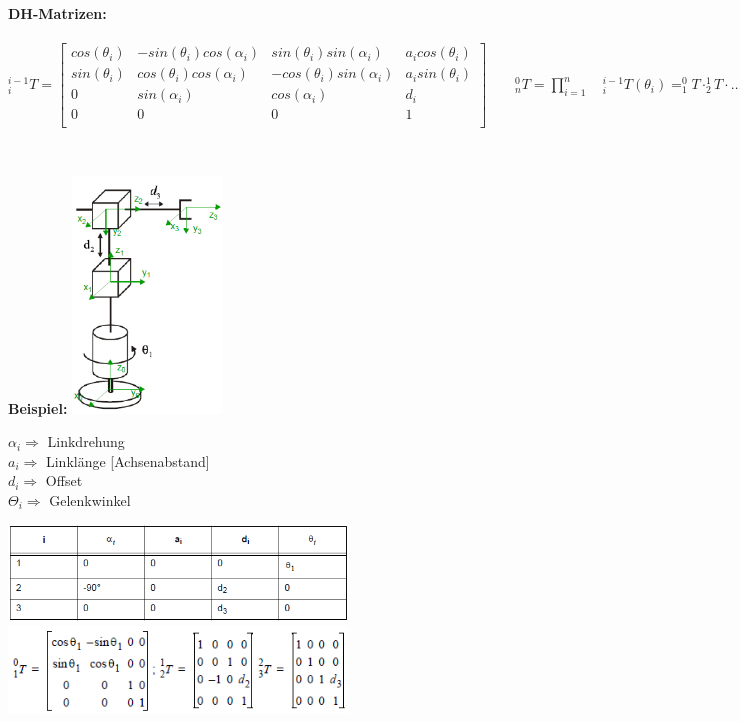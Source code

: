 \begin{minipage}{19cm}
    \textbf{DH-Matrizen: }\\ \\
    $ ^{i-1}_{i}T =
    \begin{bmatrix}
    cos(\theta_i) & -sin(\theta_i) cos(\alpha_i) &  sin(\theta_i) sin(\alpha_i) & a_i cos(\theta_i)\\
    sin(\theta_i) &  cos(\theta_i) cos(\alpha_i) & -cos(\theta_i) sin(\alpha_i) & a_i sin(\theta_i)\\
    0			  &  sin(\alpha_i)				 &  cos(\alpha_i)				& d_i\\
    0			  &  0							 &  0							& 1\\
    \end{bmatrix}
    \qquad
    ^{0}_{n}T = \prod\limits_{i=1}^{n} \quad ^{i-1}_{i}T(\theta_{i}) = ^{0}_{1}T \cdot ^{1}_{2}T \cdot \ldots \cdot ^{n-1}_{n}T $
\end{minipage}\\

\begin{minipage}{3cm}
    \textbf{Beispiel:}
    \includegraphics[width=4cm]{./bilder/denavitgrafik} \\
\end{minipage}
\begin{minipage}{6cm}
    $\alpha_{i} \Longrightarrow $ Linkdrehung  \\
    $ a_{i} \Longrightarrow $ Linklänge [Achsenabstand] \\
    $ d_{i} \Longrightarrow $ Offset \\
    $ \Theta_{i} \Longrightarrow $ Gelenkwinkel \\ 
\end{minipage}
\begin{minipage}{8cm}
    \includegraphics[width=9cm]{./bilder/denavittabelle} \\
    \includegraphics[width=9cm]{./bilder/denavitmatrix} \\
\end{minipage} \\